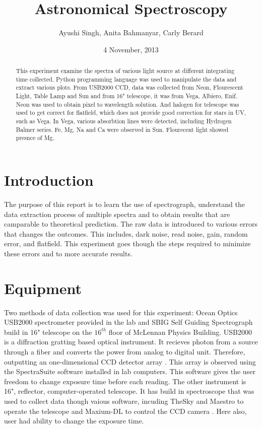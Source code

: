 \documentclass[a4paper,12pt]{article}
\makeatletter
\newcommand{\myemail}{ayushi.singh@mail.utoronto.ca}
\newcommand{\anita}{anita.bahmanyar@mail.utoronto.ca}
\newcommand{\carly}{c.berard@mail.utoronot.ca}
\makeatother
\begin{document}
\onehalfspacing
\title{Astronomical Spectroscopy}
\author{Ayushi Singh, Anita Bahmanyar, Carly Berard}
\affil{\small {\myemail}}%
\date{4 November, 2013}
\maketitle

\begin{abstract}
\label{abstract}
This experiment examine the spectra of various light source at different integrating time collected. Python programming language was used to manipulate the data and extract various plots. From USB2000 CCD, data was collected from Neon, Flourescent Light, Table Lamp and Sun and from 16" telescope, it was from Vega, Albiero, Enif. Neon was used to obtain pixel to wavelength solution. And halogen for telescope was used to get correct for flatfield, which does not provide good correction for stars in UV, such as Vega. In Vega, various absorbtion lines were detected, including Hydrogen Balmer series. Fe, Mg, Na and Ca were observed in Sun. Flourecent light showed presnce of Mg. 

\end{abstract}

\section{Introduction}
\label{sec:introduction}
The purpose of this report is to learn the use of spectrograph,  understand the data extraction process of multiple spectra and to obtain results that are camparable to theoretical prediction. The raw data is introduced to various errors that changes the outcomes. This includes, dark noise, read noise, gain, random error, and flatfield.  This experiment goes though the steps required to minimize these errors and to more accurate results. 

\section{Equipment}
\label{sec:equipment}
Two methods of data collection was used for this experiment: Ocean Optics USB2000 spectrometer provided in the lab and SBIG Self Guiding Spectrograph build in 16" telescope on the $16^{th}$ floor of McLennan Physics Building. USB2000 is a diffraction gratting based optical instrument. It recieves photon from a source through a fiber and converts the power from analog to digital unit. Therefore, outputting an one-dimensional CCD detector array \cite{instructions}. This array is observed using the SpectraSuite software installed in lab computers. This software gives the user freedom to change exposure time before each reading. The other instrument is 16", reflector, computer-operated telescope. It has build in spectroscope that was used to collect data though vaious software, incuding TheSky and Maestro to operate the telescope and Maxium-DL to control the CCD camera \cite{telescope}. Here also, user had ability to change the exposure time.
\end{document}
